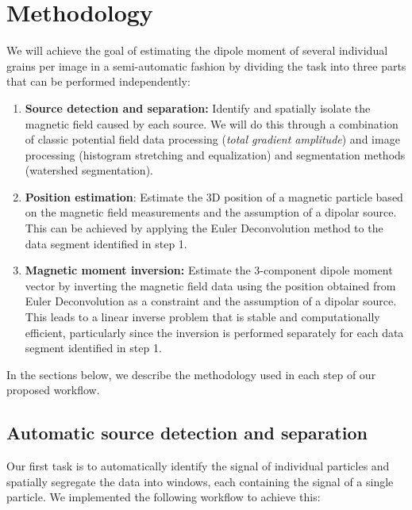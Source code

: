 \section{Methodology}

We will achieve the goal of estimating the dipole moment of several individual
grains per image in a semi-automatic fashion by dividing the task into three
parts that can be performed independently:

\begin{enumerate}
\item \textbf{Source detection and separation:} Identify and spatially isolate
  the magnetic field caused by each source. We will do this through a
  combination of classic potential field data processing (\textit{total
  gradient amplitude}) and image processing (histogram stretching and
  equalization) and segmentation methods (watershed segmentation).
\item \textbf{Position estimation}: Estimate the 3D position of a magnetic
  particle based on the magnetic field measurements and the assumption of a
  dipolar source. This can be achieved by applying the Euler Deconvolution
  method to the data segment identified in step 1.
\item \textbf{Magnetic moment inversion:} Estimate the 3-component dipole
  moment vector by inverting the magnetic field data using the position
  obtained from Euler Deconvolution as a constraint and the assumption of a
  dipolar source. This leads to a linear inverse problem that is stable and
  computationally efficient, particularly since the inversion is performed
  separately for each data segment identified in step 1.
\end{enumerate}

In the sections below, we describe the methodology used in each step of our
proposed workflow.

\subsection{Automatic source detection and separation}

Our first task is to automatically identify the signal of individual particles
and spatially segregate the data into windows, each containing the signal of a
single particle. We implemented the following workflow to achieve this:

